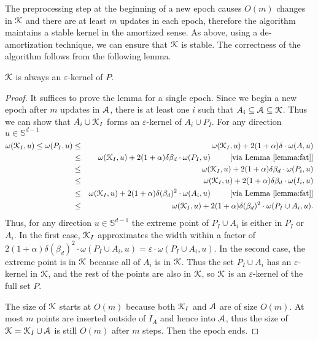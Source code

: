 \documentclass[11pt]{myclass}
\newcommand{\eps}{\varepsilon}
\renewcommand{\b}[1]{\ensuremath{\mathbb{#1}}}
\newcommand{\wid}{\omega}
\def\A{\EuScript{A}}
\def\kernel{\EuScript{K}}
\begin{document}
The preprocessing step at the  beginning of a new epoch causes $O(m)$ changes in $\kernel$
and there are at least $m$ updates in each epoch, therefore 
the algorithm maintains a 
stable kernel in the amortized sense. As above, using a de-amortization 
technique, we can ensure that $\kernel$ is stable. The correctness of the 
algorithm follows from the following lemma.





\begin{lemma}
\label{lem:anchor}
$\kernel$ is always an $\eps$-kernel of $P$.
\end{lemma}

\begin{proof}
It suffices to prove the lemma for a single epoch. Since we begin a new 
epoch after $m$ updates in $\A$, there is at least one $i$ such that
$A_i \subseteq \A \subseteq \kernel$. 
Thus we can show that $A_i \cup \kernel_I$ forms an $\eps$-kernel of 
$A_i \cup P_I$.  For any direction $u \in \b{S}^{d-1}$
\begin{eqnarray*}
\wid(\kernel_I,u) \leq \wid(P_I,u) &\leq& \wid(\kernel_I, u) + 2(1+\alpha)\delta \cdot \wid(A,u) 
\\ & \leq &
 \wid(\kernel_I, u) +  2(1+\alpha) \delta \beta_d \cdot \wid(P_I,u)  \textrm{\hspace{.3in} [via Lemma \ref{lemma:fat}]}
\\ & \leq &
 \wid(\kernel_I, u) +  2(1+\alpha) \delta \beta_d \cdot \wid(P_i,u)
\\ & \leq &
 \wid(\kernel_I, u) + 2(1+\alpha) \delta \beta_d \cdot \wid(I_i, u)
\\ & \leq &
 \wid(\kernel_I, u) + 2(1+\alpha)\delta (\beta_d)^2 \cdot \wid(A_i, u)   \textrm{\hspace{.3in} [via Lemma \ref{lemma:fat}]}
\\ & \leq &
 \wid(\kernel_I, u) + 2(1+\alpha)\delta (\beta_d)^2 \cdot \wid(P_I \cup A_i,u).
\end{eqnarray*}
Thus, for any direction $u \in \b{S}^{d-1}$ the extreme point of $P_I \cup A_i$ is either in $P_I$ or $A_i$.  In the first case, $\kernel_I$ approximates the width within a factor of $2(1+\alpha)\delta (\beta_d)^2 \cdot \wid(P_I \cup A_i, u) = \eps \cdot \wid(P_I \cup A_i, u)$.  In the second case, the extreme point is in $\kernel$ because all of $A_i$ is in $\kernel$.  
Thus the set $P_I \cup A_i$ has an $\eps$-kernel in $\kernel$, and the rest of the points are also in $\kernel$, so $\kernel$ is an $\eps$-kernel of the full set $P$.  

The size of $\kernel$ starts at $O(m)$ because both $\kernel_I$ and $\A$ are of size $O(m)$.  At most $m$ points are inserted outside of $I_{A}$ and hence into $\A$, thus the size of $\kernel = \kernel_I \cup \A$ is still $O(m)$ after $m$ steps.  Then the epoch ends.
\end{proof}
\end{document}
